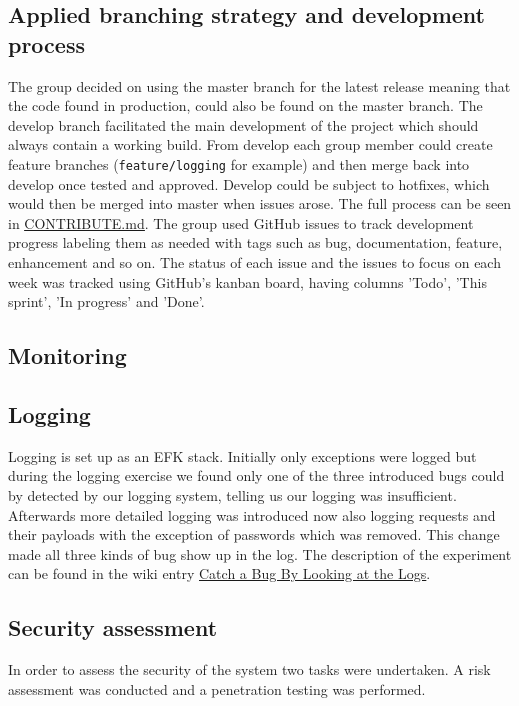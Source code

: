 
\subsection{Applied branching strategy and development process} %
The group decided on using the master branch for the latest release meaning that the code found in production, could also be found on the master branch. The develop branch facilitated the main development of the project which should always contain a working build. From develop each group member could create feature branches (\texttt{feature/logging} for example) and then merge back into develop once tested and approved. Develop could be subject to hotfixes, which would then be merged into master when issues arose. The full process can be seen in \underline{\href{https://github.com/DevOps2021-gb/devops2021/blob/main/CONTRIBUTE.md}{CONTRIBUTE.md}}. The group used GitHub issues to track development progress labeling them as needed with tags such as bug, documentation, feature, enhancement and so on. The status of each issue and the issues to focus on each week was tracked using GitHub's kanban board, having columns 'Todo', 'This sprint', 'In progress' and 'Done'.

\subsection{Monitoring} %

\subsection{Logging}
Logging is set up as an EFK stack. Initially only exceptions were logged but during the logging exercise we found only one of the three introduced bugs could by detected by our logging system, telling us our logging was insufficient. Afterwards more detailed logging was introduced now also logging requests and their payloads with the exception of passwords which was removed. This change made all three kinds of bug show up in the log. The description of the experiment can be found in the wiki entry \underline{\href{https://github.com/DevOps2021-gb/devops2021/wiki/Catch-a-Bug-By-Looking-at-the-Logs}{Catch a Bug By Looking at the Logs}}. 


\subsection{Security assessment} %
In order to assess the security of the system two tasks were undertaken. A risk assessment was conducted and a penetration testing was performed.

